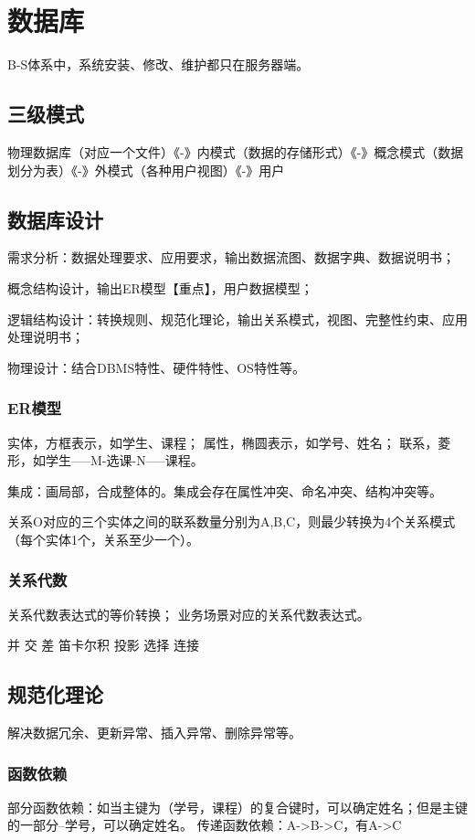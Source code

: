 \documentclass[UTF8]{../computerUniverse}
\begin{document}
\section{数据库}
B-S体系中，系统安装、修改、维护都只在服务器端。

\subsection{三级模式}
物理数据库（对应一个文件）《-》内模式（数据的存储形式）《-》概念模式（数据划分为表）《-》外模式（各种用户视图）《-》用户

\subsection{数据库设计}
需求分析：数据处理要求、应用要求，输出数据流图、数据字典、数据说明书；

概念结构设计，输出ER模型【重点】，用户数据模型；

逻辑结构设计：转换规则、规范化理论，输出关系模式，视图、完整性约束、应用处理说明书；

物理设计：结合DBMS特性、硬件特性、OS特性等。

\subsubsection{ER模型}
实体，方框表示，如学生、课程；
属性，椭圆表示，如学号、姓名；
联系，菱形，如学生-----M-选课-N-----课程。

集成：画局部，合成整体的。集成会存在属性冲突、命名冲突、结构冲突等。

关系O对应的三个实体之间的联系数量分别为A,B,C，则最少转换为4个关系模式（每个实体1个，关系至少一个）。

\subsubsection{关系代数}

关系代数表达式的等价转换；
业务场景对应的关系代数表达式。

并
交
差
笛卡尔积
投影
选择
连接

\subsection{规范化理论}
解决数据冗余、更新异常、插入异常、删除异常等。

\subsubsection{函数依赖}
部分函数依赖：如当主键为（学号，课程）的复合键时，可以确定姓名；但是主键的一部分--学号，可以确定姓名。
传递函数依赖：A->B->C，有A->C
\end{document}
